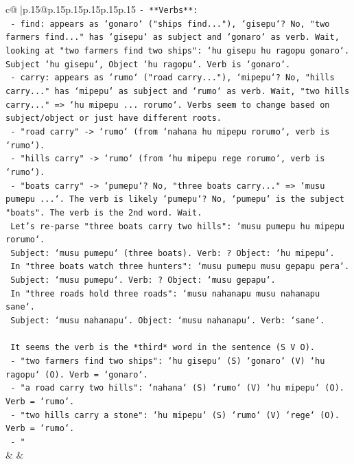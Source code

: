 \documentclass{article}
\begin{document}
{\begin{supertabular}{c@{$\;$}|p{.15\linewidth}@{}p{.15\linewidth}p{.15\linewidth}p{.15\linewidth}p{.15\linewidth}p{.15\linewidth}}
{{{\texttt{{-} **Verbs**:} \\
\texttt{  {-} find: appears as `gonaro` ("ships find..."), `gisepu`? No, "two farmers find..." has `gisepu` as subject and `gonaro` as verb. Wait, looking at "two farmers find two ships": `hu gisepu hu ragopu gonaro`. Subject `hu gisepu`, Object `hu ragopu`. Verb is `gonaro`.} \\
\texttt{  {-} carry: appears as `rumo` ("road carry..."), `mipepu`? No, "hills carry..." has `mipepu` as subject and `rumo` as verb. Wait, "two hills carry..." => `hu mipepu ... rorumo`. Verbs seem to change based on subject/object or just have different roots.} \\
\texttt{    {-} "road carry" {-}> `rumo` (from `nahana hu mipepu rorumo`, verb is `rumo`).} \\
\texttt{    {-} "hills carry" {-}> `rumo` (from `hu mipepu rege rorumo`, verb is `rumo`).} \\
\texttt{    {-} "boats carry" {-}> `pumepu`? No, "three boats carry..." => `musu pumepu ...`. The verb is likely `pumepu`? No, `pumepu` is the subject "boats". The verb is the 2nd word. Wait.} \\
\texttt{    Let's re{-}parse "three boats carry two hills": `musu pumepu hu mipepu rorumo`.} \\
\texttt{    Subject: `musu pumepu` (three boats). Verb: ? Object: `hu mipepu`.} \\
\texttt{    In "three boats watch three hunters": `musu pumepu musu gepapu pera`.} \\
\texttt{    Subject: `musu pumepu`. Verb: ? Object: `musu gepapu`.} \\
\texttt{    In "three roads hold three roads": `musu nahanapu musu nahanapu sane`.} \\
\texttt{    Subject: `musu nahanapu`. Object: `musu nahanapu`. Verb: `sane`.} \\
\\ 
\texttt{    It seems the verb is the *third* word in the sentence (S V O).} \\
\texttt{    {-} "two farmers find two ships": `hu gisepu` (S) `gonaro` (V) `hu ragopu` (O). Verb = `gonaro`.} \\
\texttt{    {-} "a road carry two hills": `nahana` (S) `rumo` (V) `hu mipepu` (O). Verb = `rumo`.} \\
\texttt{    {-} "two hills carry a stone": `hu mipepu` (S) `rumo` (V) `rege` (O). Verb = `rumo`.} \\
\texttt{    {-} "} \\
            }
        }
    }
    & & \\ \\


\end{supertabular}}
\end{document}
